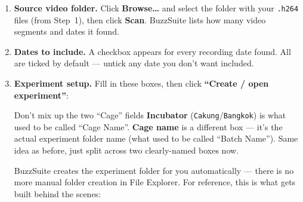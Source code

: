 \documentclass[11pt,a4paper]{article}
\begin{document}
\begin{enumerate}[label=\textbf{\Alph*\ ---}\ ,leftmargin=*,itemsep=8pt]
  \item \textbf{Source video folder.} Click \textbf{Browse\ldots} and select the folder
        with your \texttt{.h264} files (from Step~1), then click \textbf{Scan}. BuzzSuite lists
        how many video segments and dates it found.

  \item \textbf{Dates to include.} A checkbox appears for every recording date found. All
        are ticked by default --- untick any date you don't want included.

  \item \textbf{Experiment setup.} Fill in these boxes, then click
        \textbf{``Create / open experiment''}:


\begin{tipbox}{Don't mix up the two ``Cage'' fields}
\textbf{Incubator} (\texttt{Cakung}/\texttt{Bangkok}) is what used to be called ``Cage Name''.
\textbf{Cage name} is a different box --- it's the actual experiment folder name (what used to be
called ``Batch Name''). Same idea as before, just split across two clearly-named boxes now.
\end{tipbox}

BuzzSuite creates the experiment folder for you automatically --- there is no more manual folder
creation in File Explorer. For reference, this is what gets built behind the scenes:


\end{enumerate}
\end{document}
